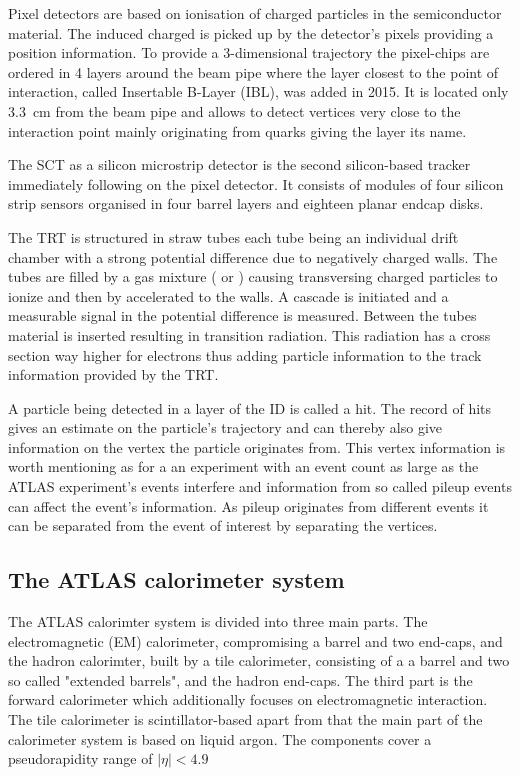 Pixel detectors are based on ionisation of charged particles in the semiconductor material. The induced charged is picked up by the detector's pixels providing a position information. To provide a 3-dimensional trajectory the pixel-chips are ordered in 4 layers around the beam pipe where the layer closest to the point of interaction, called Insertable B-Layer (IBL), was added in 2015. It is located only \SI{3.3}{\centi \metre} from the beam pipe and allows to detect vertices very close to the interaction point mainly originating from \Pbottom quarks giving the layer its name.~\cite{pixel_run2}

The SCT as a silicon microstrip detector is the second silicon-based tracker immediately following on the pixel detector. It consists of modules of four silicon strip sensors organised in four barrel layers and eighteen planar endcap disks.

The TRT is structured in straw tubes each tube being an individual drift chamber with a strong potential difference due to negatively charged walls. The tubes are filled by a gas mixture ( or ) causing transversing charged particles to ionize and then by accelerated to the walls. A cascade is initiated and a measurable signal in the potential difference is measured. 
Between the tubes material is inserted resulting in transition radiation. This radiation has a cross section way higher for electrons thus adding particle information to the track information provided by the TRT.

A particle being detected in a layer of the ID is called a hit. The record of hits gives an estimate on the particle's trajectory and can thereby also give information on the vertex the particle originates from. This vertex information is worth mentioning as for a an experiment with an event count as large as the ATLAS experiment's events interfere and information from so called pileup events can affect the event's information. As pileup originates from different events it can be separated from the event of interest by separating the vertices.

\subsection{The ATLAS calorimeter system}

The ATLAS calorimter system is divided into three main parts. The electromagnetic (EM) calorimeter, compromising a barrel and two end-caps, and the hadron calorimter, built by a tile calorimeter, consisting of a a barrel and two so called "extended barrels", and the hadron end-caps. The third part is the forward calorimeter which additionally focuses on electromagnetic interaction. The tile calorimeter is scintillator-based apart from that the main part of the calorimeter system is based on liquid argon. The components cover a pseudorapidity range of $|\eta| < 4.9$


